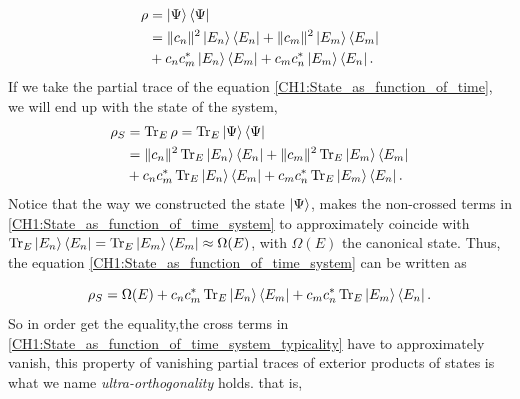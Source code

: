 \begin{equation}
\begin{aligned}
\rho &= \mathinner{|{\Psi}\rangle}\mathinner{\langle{\Psi}|}\\
&= \|c_n\|^2 \mathinner{|{E_n}\rangle}\mathinner{\langle{E_n}|} +  \|c_m\|^2 \mathinner{|{E_m}\rangle}\mathinner{\langle{E_m}|} \\
& + c_n c^{*}_m  \mathinner{|{E_n}\rangle}\mathinner{\langle{E_m}|}+ c_m c^{*}_n \mathinner{|{E_m}\rangle}\mathinner{\langle{E_n}|}.
\end{aligned}
\label{CH1:State_as_function_of_time}
\end{equation}
If we take the partial trace of the equation \eqref{CH1:State_as_function_of_time}, we will end up with the state of the system,
\begin{equation}
\begin{aligned}
\rho_S &= \operatorname{Tr}_E \rho = \operatorname{Tr}_E  \mathinner{|{\Psi}\rangle}\mathinner{\langle{\Psi}|}\\
&= \|c_n\|^2\operatorname{Tr}_E  \mathinner{|{E_n}\rangle}\mathinner{\langle{E_n}|} +  \|c_m\|^2 \operatorname{Tr}_E \mathinner{|{E_m}\rangle}\mathinner{\langle{E_m}|} \\
& + c_n c^{*}_m  \operatorname{Tr}_E \mathinner{|{E_n}\rangle}\mathinner{\langle{E_m}|} + c_m c^{*}_n \operatorname{Tr}_E \mathinner{|{E_m}\rangle}\mathinner{\langle{E_n}|}.
\end{aligned}
\label{CH1:State_as_function_of_time_system}
\end{equation}
\indent  Notice that the way we constructed the state $\mathinner{|{\Psi}\rangle}$, makes the non-crossed terms in \eqref{CH1:State_as_function_of_time_system} to approximately  coincide with $\operatorname{Tr}_E \mathinner{|{E_n}\rangle}\mathinner{\langle{E_n}|} =\operatorname{Tr}_E \mathinner{|{E_m}\rangle}\mathinner{\langle{E_m}|} \approx \Omega(E)$, with $\Omega(E)$ the canonical state. Thus, the equation \eqref{CH1:State_as_function_of_time_system} can be written as


\begin{equation}
\rho_S= \Omega(E) + c_n c^{*}_m  \operatorname{Tr}_E \mathinner{|{E_n}\rangle}\mathinner{\langle{E_m}|} + c_m c^{*}_n \operatorname{Tr}_E \mathinner{|{E_m}\rangle}\mathinner{\langle{E_n}|}.
\label{CH1:State_as_function_of_time_system_typicality}
\end{equation}
\indent So in order get the equality,the cross terms in \eqref{CH1:State_as_function_of_time_system_typicality} have to  approximately vanish, this property of vanishing partial traces of exterior products of states is what we name \textit{ultra-orthogonality} holds. that is,

